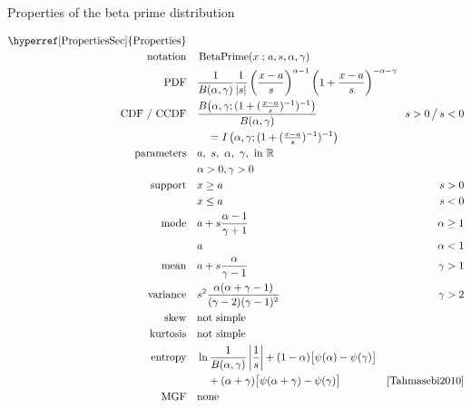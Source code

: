 

\begin{table*}[tp]
\caption[Beta prime distribution -- Properties] {Properties of the beta prime distribution}
\begin{align*}
 \text{\hyperref[PropertiesSec]{Properties}}  \quad& \\
\text{notation} \quad & \op{BetaPrime}(x\given a, s, \alpha,\gamma)  	\checked
\\
\text{PDF}\quad &    \frac{1}{B(\alpha, \gamma)} \frac{1}{|s|}
\left(\frac{x-a}{s}\right)^{\alpha -1} \left(1+ \frac{x-a}{s} \right)^{-\alpha-\gamma } \checked
\hspace{-2em}
\\
\text{CDF / CCDF} \quad  &  
\frac{B\big(\alpha, \gamma; (1+(\tfrac{x-a}{s})^{-1})^{-1} \big) }{B(\alpha,\gamma)} \checked
\hspace{-8em}
& s >0 \,\big/ \, s<0
\\ 
& \quad = I\left(  \alpha,\gamma; (1+(\tfrac{x-a}{s})^{-1})^{-1} \right) 			\checked
\\
\text{parameters}\quad &   a,\ s,\ \alpha,\ \gamma, \text{ in } \Real \checked 
\\ & \alpha>0, \gamma>0 \checked
\\
\text{support} \quad &    x \geq a &  s > 0 			\checked
\\
&  x\leq a  &  s < 0 							\checked
\\
\text{mode} \quad  & a + s \frac{\alpha-1}{\gamma+1} & \alpha\geq 1 \checked \\
& a &\alpha<1 \checked
\\
\text{mean} \quad  &   a+s \frac{ \alpha}{\gamma-1} \checked
& \gamma >1
\\
\text{variance} \quad  &s^2
\frac{\alpha(\alpha+\gamma-1)}{(\gamma-2)(\gamma-1)^2} \checked
  \hspace{-8em}
&   \gamma>2
\\
\text{skew} \quad  &  \text{not simple}
\\
\text{kurtosis} \quad  &  \text{not simple}
\\
\text{entropy} \quad  &   \ln \frac{1}{B(\alpha, \gamma)} \left|\frac{1}{s}\right|
  +(1-\alpha) \big[ \psi(\alpha) - \psi(\gamma)\big]
  \hspace{-8em}
\\
& \quad +(\alpha+\gamma) \big[ \psi(\alpha+\gamma) - \psi(\gamma)\big] \checked &  \text{\cite[Eq.~(15)]{Tahmasebi2010}}
\\
\text{MGF} \quad  &  \text{none}
\end{align*}
\end{table*}


